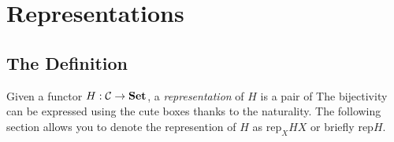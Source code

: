 \section{Representations}

\subsection{The Definition}

Given a functor $H : \mathcal{C} \to \boldsymbol{\mathrm{Set}}$, a \emph{representation} of $H$ is a pair of 
The bijectivity can be expressed using the cute boxes
thanks to the naturality.
\mynewline
The following section allows you to denote the represention of $H$ as %
$\text{rep}_X HX$ or briefly $\text{rep}H$.

